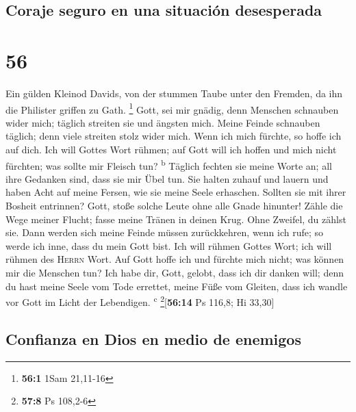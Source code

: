 \hypertarget{coraje-seguro-en-una-situaciuxf3n-desesperada}{%
\subsection{Coraje seguro en una situación
desesperada}\label{coraje-seguro-en-una-situaciuxf3n-desesperada}}

\hypertarget{section-55}{%
\section{56}\label{section-55}}

 Ein gülden Kleinod Davids, von der stummen Taube unter
den Fremden, da ihn die Philister griffen zu Gath. \footnote{\textbf{56:1}
  1Sam 21,11-16}  Gott, sei mir gnädig, denn Menschen
schnauben wider mich; täglich streiten sie und ängsten mich.
 Meine Feinde schnauben täglich; denn viele streiten stolz
wider mich.  Wenn ich mich fürchte, so hoffe ich auf dich.
 Ich will Gottes Wort rühmen; auf Gott will ich hoffen und
mich nicht fürchten; was sollte mir Fleisch tun? \textsuperscript{b}
 Täglich fechten sie meine Worte an; all ihre Gedanken
sind, dass sie mir Übel tun.  Sie halten zuhauf und lauern
und haben Acht auf meine Fersen, wie sie meine Seele erhaschen.
 Sollten sie mit ihrer Bosheit entrinnen? Gott, stoße
solche Leute ohne alle Gnade hinunter!  Zähle die Wege
meiner Flucht; fasse meine Tränen in deinen Krug. Ohne Zweifel, du
zählst sie.  Dann werden sich meine Feinde müssen
zurückkehren, wenn ich rufe; so werde ich inne, dass du mein Gott bist.
 Ich will rühmen Gottes Wort; ich will rühmen des
\textsc{Herrn} Wort.  Auf Gott hoffe ich und fürchte mich
nicht; was können mir die Menschen tun?  Ich habe dir,
Gott, gelobt, dass ich dir danken will;  denn du hast
meine Seele vom Tode errettet, meine Füße vom Gleiten, dass ich wandle
vor Gott im Licht der Lebendigen. \textsuperscript{c}
\footnote{\textbf{57:8} Ps 108,2-6}{[}\textbf{56:14} Ps 116,8; Hi
33,30{]}

\hypertarget{confianza-en-dios-en-medio-de-enemigos}{%
\subsection{Confianza en Dios en medio de
enemigos}\label{confianza-en-dios-en-medio-de-enemigos}}

